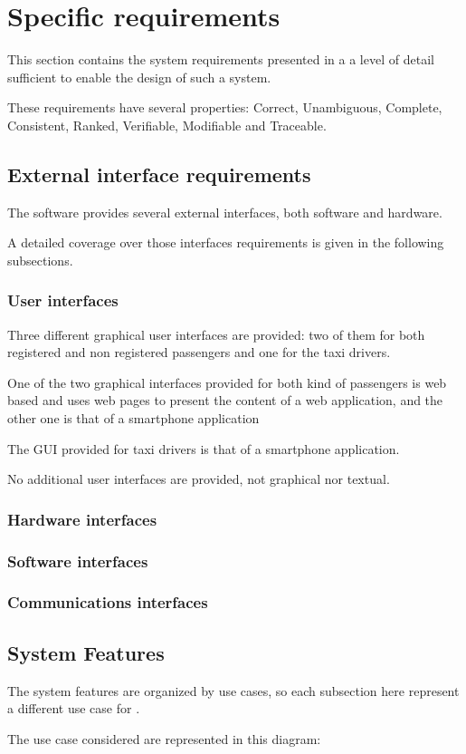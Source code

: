 \section{Specific requirements}
This section contains the system requirements presented in a a level of detail sufficient to enable the design of such a system.\par
These requirements have several properties: Correct, Unambiguous, Complete, Consistent, Ranked, Verifiable, Modifiable and Traceable.
\subsection{External interface requirements}
The software \myTaxiService{} provides several external interfaces, both software and hardware.\par
A detailed coverage over those interfaces requirements is given in the following subsections.
\subsubsection{User interfaces}
Three different graphical user interfaces are provided: two of them for both registered and non registered passengers and one for the taxi drivers.\par
One of the two graphical interfaces provided for both kind of passengers is web based and uses web pages to present the content of a web application, and the other one is that of a smartphone application\par
The GUI provided for taxi drivers is that of a smartphone application.\par
No additional user interfaces are provided, not graphical nor textual.
\subsubsection{Hardware interfaces}
\subsubsection{Software interfaces}
\subsubsection{Communications interfaces}
\subsection{System Features}
The system features are organized by use cases, so each subsection here represent a different use case for \myTaxiService{}.\par
The use case considered are represented in this diagram: 

